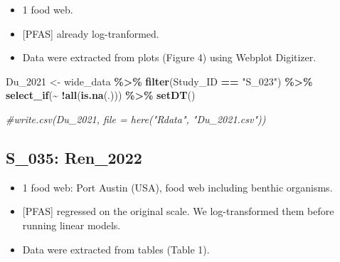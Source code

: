 \documentclass[
]{article}
\newenvironment{Shaded}{\begin{snugshade}}{\end{snugshade}}
\newcommand{\CommentTok}[1]{\textcolor[rgb]{0.56,0.35,0.01}{\textit{#1}}}
\newcommand{\FunctionTok}[1]{\textcolor[rgb]{0.13,0.29,0.53}{\textbf{#1}}}
\newcommand{\NormalTok}[1]{#1}
\newcommand{\OtherTok}[1]{\textcolor[rgb]{0.56,0.35,0.01}{#1}}
\newcommand{\SpecialCharTok}[1]{\textcolor[rgb]{0.81,0.36,0.00}{\textbf{#1}}}
\newcommand{\StringTok}[1]{\textcolor[rgb]{0.31,0.60,0.02}{#1}}
\providecommand{\tightlist}{%
  \setlength{\itemsep}{0pt}\setlength{\parskip}{0pt}}
\begin{document}
\begin{itemize}
\tightlist
\item
  1 food web.
\item
  {[}PFAS{]} already log-tranformed.
\item
  Data were extracted from plots (Figure 4) using Webplot Digitizer.
\end{itemize}

\begin{Shaded}
\begin{Highlighting}[]
\NormalTok{Du\_2021 }\OtherTok{\textless{}{-}}\NormalTok{ wide\_data }\SpecialCharTok{\%\textgreater{}\%} 
  \FunctionTok{filter}\NormalTok{(Study\_ID }\SpecialCharTok{==} \StringTok{"S\_023"}\NormalTok{) }\SpecialCharTok{\%\textgreater{}\%}
  \FunctionTok{select\_if}\NormalTok{(}\SpecialCharTok{\textasciitilde{}} \SpecialCharTok{!}\FunctionTok{all}\NormalTok{(}\FunctionTok{is.na}\NormalTok{(.))) }\SpecialCharTok{\%\textgreater{}\%}
  \FunctionTok{setDT}\NormalTok{()}

\CommentTok{\#write.csv(Du\_2021, file = here("Rdata", "Du\_2021.csv"))}
\end{Highlighting}
\end{Shaded}

\subsection{S\_035: Ren\_2022}\label{s_035-ren_2022}

\begin{itemize}
\tightlist
\item
  1 food web: Port Austin (USA), food web including benthic organisms.
\item
  {[}PFAS{]} regressed on the original scale. We log-transformed them
  before running linear models.
\item
  Data were extracted from tables (Table 1).
\end{itemize}
\end{document}
